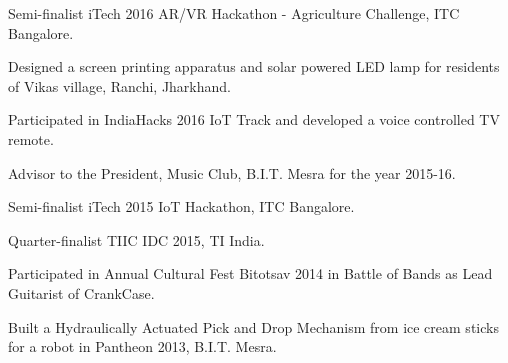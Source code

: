 \begin{cventries}
  \cventry
  {}
  {}
  {}
  {}
  {\vspace{-4mm}
   \begin{cvitems}
     \item {Semi-finalist iTech 2016 AR/VR Hackathon - Agriculture Challenge, ITC Bangalore.}
	 \item {Designed a screen printing apparatus and solar powered LED lamp for residents of Vikas village, Ranchi, Jharkhand.}   	 
   	 \item {Participated in IndiaHacks 2016 IoT Track and developed a voice controlled TV remote.}
     \item {Advisor to the President, Music Club, B.I.T. Mesra for the year 2015-16.}
     \item {Semi-finalist iTech 2015 IoT Hackathon, ITC Bangalore.}
     \item {Quarter-finalist TIIC IDC 2015, TI India.}     
     \item {Participated in Annual Cultural Fest Bitotsav 2014 in Battle of Bands as Lead Guitarist of CrankCase.}
	 \item {Built a Hydraulically Actuated Pick and Drop Mechanism from ice cream sticks for a robot in Pantheon 2013, B.I.T. Mesra.}
   \end{cvitems}
   }
\end{cventries}